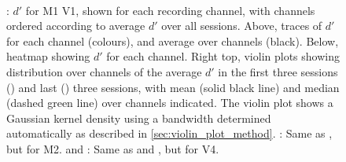 \begin{figure}[htbp]
    \centering
    \hspace*{\fill}
    \hspace*{\fill}\hspace{.2cm}\hspace*{\fill}
    \hspace*{\fill}
    \\
    \hspace*{\fill}
    \hspace*{\fill}\hspace{.2cm}\hspace*{\fill}
    \hspace*{\fill}
    \caption{
\protect{}: $d'$ for \ac{M1} \ac{V1}, shown for each recording channel, with channels ordered according to average $d'$ over all sessions.
Above, traces of $d'$ for each channel (colours), and average over channels (black).
Below, heatmap showing $d'$ for each channel.
Right top, violin plots showing distribution over channels of the average $d'$ in the first three sessions () and last () three sessions, with mean (solid black line) and median (dashed green line) over channels indicated.
The violin plot shows a Gaussian kernel density using a bandwidth determined automatically as described in \autoref{sec:violin_plot_method}.
\protect{}: Same as \protect{}, but for \ac{M2}.
\protect{} and \protect{}: Same as \protect{} and \protect{}, but for \ac{V4}.
}
\label{fig:dprime}
\label{fig:dprime_v1}
\label{fig:dprime_v4}
\end{figure}

